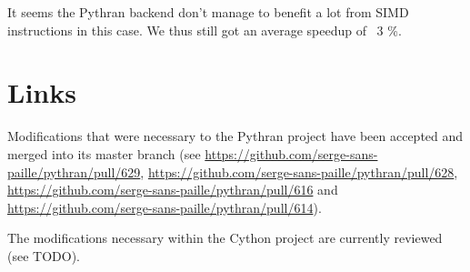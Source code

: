 \documentclass{deliverablereport}
\begin{document}
It seems the Pythran backend don't manage to benefit a lot from SIMD
instructions in this case. We thus still got an average speedup of ~3 \%.

\section{Links}
\label{sec:links}

Modifications that were necessary to the Pythran project have been accepted and
merged into its master branch (see
\url{https://github.com/serge-sans-paille/pythran/pull/629},
\url{https://github.com/serge-sans-paille/pythran/pull/628},
\url{https://github.com/serge-sans-paille/pythran/pull/616} and
\url{https://github.com/serge-sans-paille/pythran/pull/614}).

The modifications necessary within the Cython project are currently reviewed
(see TODO).

\printbibliography
\end{document}
